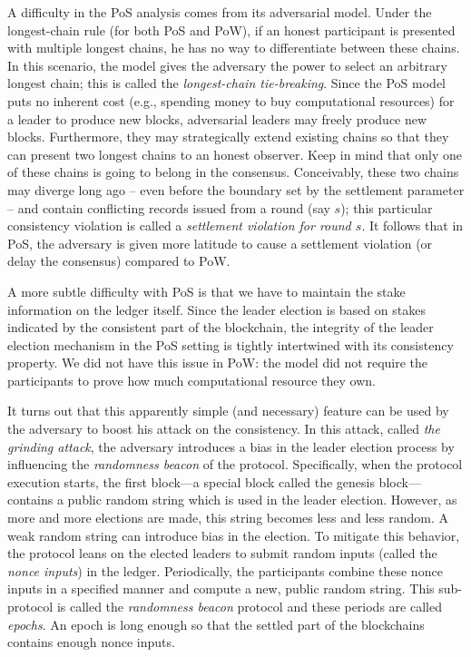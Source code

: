 A difficulty in the PoS analysis 
comes from its adversarial model. 
Under the longest-chain rule (for both PoS and PoW), 
if an honest participant 
is presented with multiple longest chains, 
he has no way to differentiate between these chains. 
In this scenario, the model gives the adversary the power to 
select an arbitrary longest chain; 
this is called the \emph{longest-chain tie-breaking}. 
Since the PoS model puts no inherent cost 
(e.g., spending money to buy computational resources) 
for a leader to produce new blocks, 
adversarial leaders may 
freely produce new blocks. 
Furthermore, they may strategically 
extend existing chains 
so that they can 
present two longest chains to an honest observer. 
Keep in mind that only one of these chains 
is going to belong in the consensus. 
Conceivably, these two chains may diverge 
long ago -- even before the boundary set by the settlement parameter -- and 
contain conflicting records issued from a round (say $s$); 
this particular consistency violation is called a \emph{settlement violation for round $s$}.  
It follows that in PoS, 
the adversary is given more latitude to 
cause a settlement violation (or delay the consensus) 
compared to PoW. 


A more subtle difficulty with PoS is that 
we have to maintain the stake information on the ledger itself. 
Since the leader election is based on stakes indicated by the 
consistent part of the blockchain, 
the integrity of the leader election mechanism in the PoS setting 
is tightly intertwined 
with its consistency property. 
We did not have this issue in PoW: 
the model did not require the participants to prove 
how much computational resource they own. 

It turns out that this apparently simple (and necessary) feature can be used by the adversary
to boost his attack on the consistency. 
In this attack, called \emph{the grinding attack}, 
the adversary introduces a bias in the leader election process  
by influencing the \emph{randomness beacon} of the protocol. 
Specifically, when the protocol execution starts, 
the first block---a special block called the genesis block---contains 
a public random string which is used in the leader election. 
However, as more and more elections are made, 
this string becomes less and less random. 
A weak random string can introduce bias in the election. 
To mitigate this behavior, 
the protocol leans on the elected leaders to 
submit random inputs (called the \emph{nonce inputs}) in the ledger. 
Periodically, the participants combine these nonce inputs in a specified manner 
and compute a new, public random string. 
This sub-protocol is called the \emph{randomness beacon} protocol 
and these periods are called \emph{epochs}. 
An epoch is long enough so that the settled part of the blockchains contains enough nonce inputs. 

